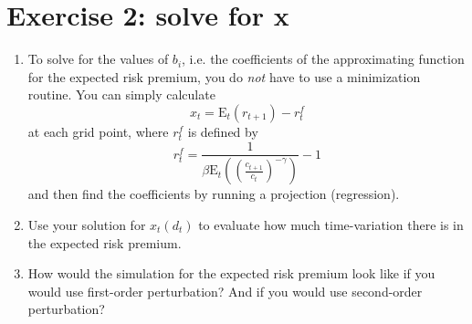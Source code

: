 \documentclass{article}
\begin{document}
\section{Exercise 2: solve for x}

\begin{enumerate}
\item To solve for the values of $b_{i}$, i.e. the coefficients of the
approximating function for the expected risk premium, you do \emph{not} have
to use a minimization routine. You can simply calculate%
\begin{equation*}
x_{t}=\text{E}_{t}\left( r_{t+1}\right) -r_{t}^{f}
\end{equation*}%
at each grid point, where $r_{t}^{f}$ is defined by%
\begin{equation*}
r_{t}^{f}=\frac{1}{\beta \text{E}_{t}\left( \left( \frac{c_{t+1}}{c_{t}}%
\right) ^{-\gamma }\right) }-1
\end{equation*}%
and then find the coefficients by running a projection (regression).

\item Use your solution for $x_{t}(d_{t})$ to evaluate how much
time-variation there is in the expected risk premium.

\item How would the simulation for the expected risk premium look like if
you would use first-order perturbation? And if you would use second-order
perturbation?
\end{enumerate}
\end{document}
